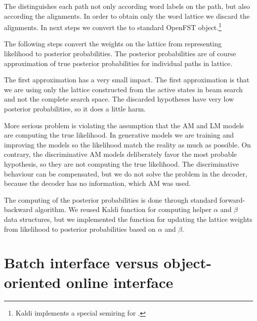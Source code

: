 The  distinguishes each path not only according word labels on the path,
but also according the alignments.
In order to obtain only the word lattice we discard the alignments.
In next steps we convert the  to standard OpenFST object.\footnote{Kaldi implements a special semiring for \cite{povey2012generating}.}  

The following steps convert the weights on the lattice from representing likelihood
to posterior probabilities. The posterior probabilities are of course approximation of
true posterior probabilities for individual paths in lattice. 

The first approximation has a very small impact. The first approximation is 
that we are using only the lattice constructed from the active states in beam search
and not the complete search space. 
The discarded hypotheses have very low posterior probabilities, so it does a little harm.

More serious problem is violating the assumption that the \ac{AM} and \ac{LM} models are 
computing the true likelihood. 
In generative models we are training and improving the models so the likelihood match
the reality as much as possible.
On contrary, the discriminative \ac{AM} models deliberately favor the most probable hypothesis,
so they are not computing the true likelihood.
The discriminative behaviour can be compensated, but we do not solve the problem
in the decoder, because the decoder has no information, which \ac{AM} was used.


The computing of the posterior probabilities is done through
standard forward-backward algorithm\cite{todo}.
We reused Kaldi function for computing helper $\alpha$ and $\beta$ data structures,
but we implemented the  function for updating the lattice weights 
from likelihood to posterior probabilities based on $\alpha$ and $\beta$.

\section{Batch interface versus object-oriented online interface}
\label{sec:ooi}


